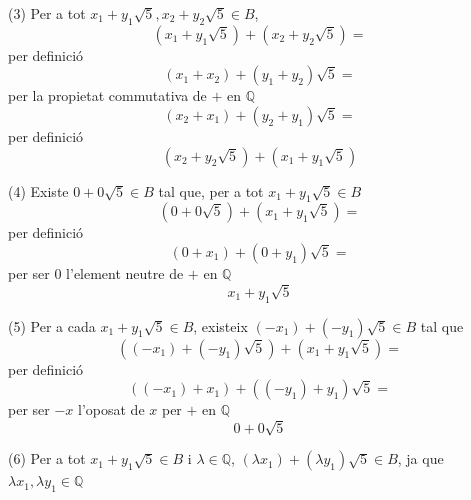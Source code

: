 \begin{solucio}
(3) Per a tot $x_{1}+y_{1}\sqrt{5},x_{2}+y_{2}\sqrt{5}\in B$,
\begin{equation*}
\left( x_{1}+y_{1}\sqrt{5}\right) +\left( x_{2}+y_{2}\sqrt{5}\right) =
\end{equation*}%
per definició%
\begin{equation*}
(x_{1}+x_{2})+(y_{1}+y_{2})\sqrt{5}=
\end{equation*}%
per la propietat commutativa de $+$ en $\mathbb{Q}$%
\begin{equation*}
(x_{2}+x_{1})+(y_{2}+y_{1})\sqrt{5}=
\end{equation*}%
per definició%
\begin{equation*}
\left( x_{2}+y_{2}\sqrt{5}\right) +\left( x_{1}+y_{1}\sqrt{5}\right)
\end{equation*}

(4) Existe $0+0\sqrt{5}\in B$ tal que, per a tot $x_{1}+y_{1}\sqrt{5}\in B$
\begin{equation*}
\left( 0+0\sqrt{5}\right) +\left( x_{1}+y_{1}\sqrt{5}\right) =
\end{equation*}%
per definició%
\begin{equation*}
(0+x_{1})+(0+y_{1})\sqrt{5}=
\end{equation*}%
per ser $0$ l'element neutre de $+$ en $\mathbb{Q}$%
\begin{equation*}
x_{1}+y_{1}\sqrt{5}
\end{equation*}

(5) Per a cada $x_{1}+y_{1}\sqrt{5}\in B$, existeix $\left( -x_{1}\right)
+(-y_{1})\sqrt{5}\in B$ tal que%
\begin{equation*}
\left( \left( -x_{1}\right) +(-y_{1})\sqrt{5}\right) +\left( x_{1}+y_{1}%
\sqrt{5}\right) =
\end{equation*}%
per definició%
\begin{equation*}
((-x_{1})+x_{1})+((-y_{1})+y_{1})\sqrt{5}=
\end{equation*}%
per ser $-x$ l'oposat de $x$ per $+$ en $\mathbb{Q}$%
\begin{equation*}
0+0\sqrt{5}
\end{equation*}

(6) Per a tot $x_{1}+y_{1}\sqrt{5}\in B$ i $\lambda \in \mathbb{Q}$, $\left(
\lambda x_{1}\right) +\left( \lambda y_{1}\right) \sqrt{5}\in B$, ja que $%
\lambda x_{1},\lambda y_{1}\in \mathbb{Q}$


\end{solucio}
